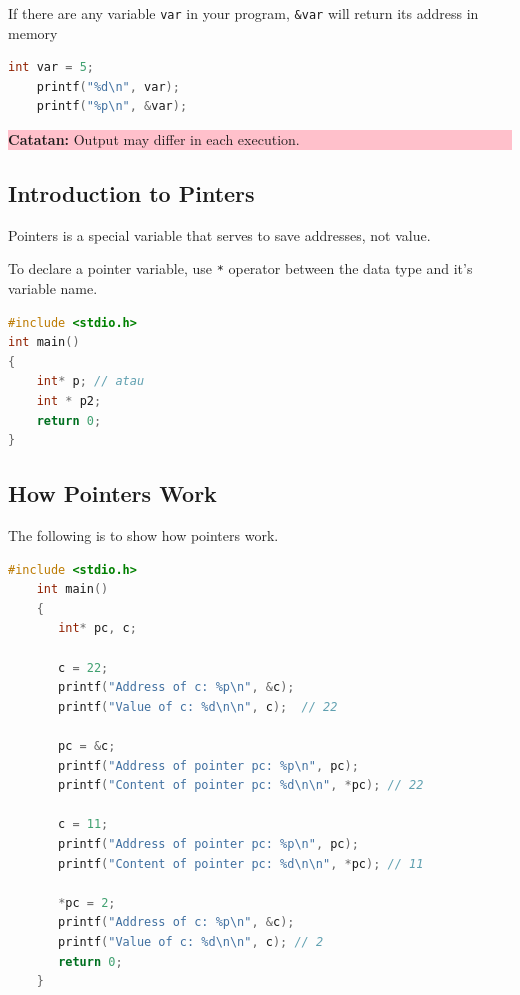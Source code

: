If there are any variable \verb|var| in your program, \verb|&var| will return its address in memory
\begin{lstlisting}[language=c]
    int var = 5;
    printf("%d\n", var);
    printf("%p\n", &var);
\end{lstlisting}
\begin{center}
    \colorbox{pink}{\parbox{0.8\linewidth}{\textbf{Catatan:} Output may differ in each execution.}}
\end{center}

\subsection{Introduction to Pinters}

Pointers is a special variable that serves to save addresses, not value.

To declare a pointer variable, use \verb|*| operator between the data type and it's variable name.
\begin{lstlisting}[language=c]
	#include <stdio.h>
int main()
{
	int* p; // atau
    int * p2;
	return 0;
}
\end{lstlisting}


\subsection{How Pointers Work}
The following is to show how pointers work.
\begin{lstlisting}[language=c, caption={Program Example}]
    #include <stdio.h>
    int main()
    {
       int* pc, c;
       
       c = 22;
       printf("Address of c: %p\n", &c);
       printf("Value of c: %d\n\n", c);  // 22
       
       pc = &c;
       printf("Address of pointer pc: %p\n", pc);
       printf("Content of pointer pc: %d\n\n", *pc); // 22
       
       c = 11;
       printf("Address of pointer pc: %p\n", pc);
       printf("Content of pointer pc: %d\n\n", *pc); // 11
       
       *pc = 2;
       printf("Address of c: %p\n", &c);
       printf("Value of c: %d\n\n", c); // 2
       return 0;
    }
\end{lstlisting}

